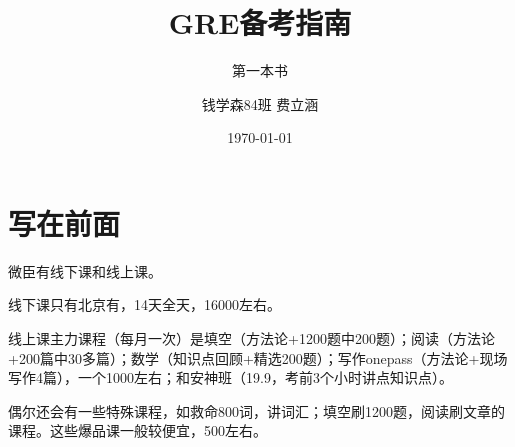 \documentclass[cn,plain]{./src/qyxfbook}
\title{GRE备考指南}
\subtitle{第一本书}
\author{钱学森84班 费立涵}
\institute{钱学森学院学业辅导中心}
\date{\today}
\begin{document}
\maketitle
%
%	

\tableofcontents

\hypersetup{pageanchor=true}
	
\chapter{写在前面}
		微臣有线下课和线上课。\par
		线下课只有北京有，14天全天，16000左右。\par
		线上课主力课程（每月一次）是填空（方法论+1200题中200题）；阅读（方法论+200篇中30多篇）；数学（知识点回顾+精选200题）；写作onepass（方法论+现场写作4篇），一个1000左右；和安神班（19.9，考前3个小时讲点知识点）。\par
		偶尔还会有一些特殊课程，如救命800词，讲词汇；填空刷1200题，阅读刷文章的课程。这些爆品课一般较便宜，500左右。
\end{document}
